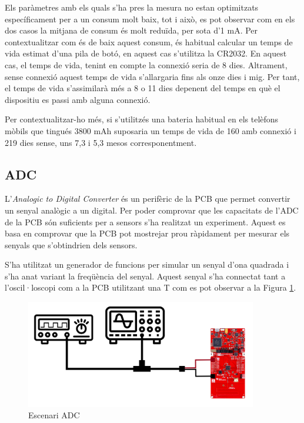 Els paràmetres amb els quals s'ha pres la mesura no estan optimitzats específicament per a un consum molt baix, tot i això, es pot observar com en els dos casos la mitjana de consum és molt reduïda, per sota d'1 mA.
Per contextualitzar com és de baix aquest consum, és habitual calcular un temps de vida estimat d'una pila de botó, en aquest cas s'utilitza la CR2032.
En aquest cas, el temps de vida, tenint en compte la connexió seria de 8 dies.
Altrament, sense connexió aquest temps de vida s'allargaria fins als onze dies i mig.
Per tant, el temps de vida s'assimilarà més a 8 o 11 dies depenent del temps en què el dispositiu es passi amb alguna connexió.

Per contextualitzar-ho més, si s'utilitzés una bateria habitual en els telèfons mòbils que tingués 3800 mAh suposaria un temps de vida de 160 amb connexió i 219 dies sense, uns 7,3 i 5,3 mesos corresponentment.


\subsection{ADC}
L'\textit{Analogic to Digital Converter} és un perifèric de la PCB que permet convertir un senyal analògic a un digital.
Per poder comprovar que les capacitats de l'ADC de la PCB són suficients per a sensors s'ha realitzat un experiment.
Aquest es basa en comprovar que la PCB pot mostrejar prou ràpidament per mesurar els senyals que s'obtindrien dels sensors.

S'ha utilitzat un generador de funcions per simular un senyal d'ona quadrada i s'ha anat variant la freqüència del senyal. Aquest senyal s'ha connectat tant a l'oscil·loscopi com a la PCB utilitzant una T com es pot observar a la Figura \ref{lab}.

\begin{figure}[!h]
	\begin{center}
		\includegraphics[width=0.9\textwidth]{./images/CicrcuitoExperimentoLab2.png}
		\caption{Escenari ADC}
		\label{lab}
	\end{center}
\end{figure}


